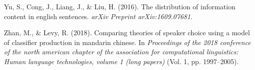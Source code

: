 \documentclass[10pt, letterpaper]{article}
\begin{document}
\leavevmode\hypertarget{ref-yu2016}{}%
Yu, S., Cong, J., Liang, J., \& Liu, H. (2016). The distribution of
information content in english sentences. \emph{arXiv Preprint
arXiv:1609.07681}.

\leavevmode\hypertarget{ref-zhan2018}{}%
Zhan, M., \& Levy, R. (2018). Comparing theories of speaker choice using
a model of classifier production in mandarin chinese. In
\emph{Proceedings of the 2018 conference of the north american chapter
of the association for computational linguistics: Human language
technologies, volume 1 (long papers)} (Vol. 1, pp. 1997--2005).


\end{document}
